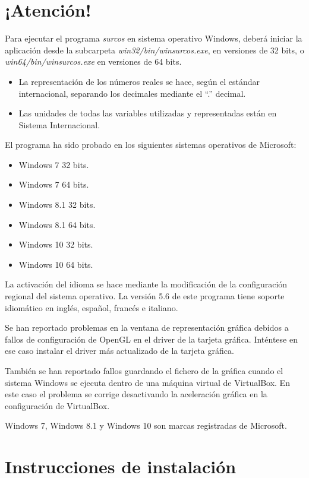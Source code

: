 \chapter*{¡Atención!}

Para ejecutar el programa \emph{surcos} en sistema operativo Windows, deberá
iniciar la aplicación desde la subcarpeta \emph{win32/bin/winsurcos.exe}, en
versiones de 32 bits, o \emph{win64/bin/winsurcos.exe} en versiones de 64 bits.

\begin{itemize}
\item La representación de los números reales se hace, según el estándar
internacional, separando los decimales mediante el ``.'' decimal.
\item Las unidades de todas las variables utilizadas y representadas están en
Sistema Internacional.
\end{itemize}

El programa ha sido probado en los siguientes sistemas operativos de Microsoft:
\begin{itemize}
\item Windows 7 32 bits.
\item Windows 7 64 bits.
\item Windows 8.1 32 bits.
\item Windows 8.1 64 bits.
\item Windows 10 32 bits.
\item Windows 10 64 bits.
\end{itemize}

La activación del idioma se hace mediante la modificación de la configuración
regional del sistema operativo. La versión 5.6 de este programa tiene soporte
idiomático en inglés, español, francés e italiano. 

Se han reportado problemas en la ventana de representación gráfica debidos a
fallos de configuración de OpenGL en el driver de la tarjeta gráfica. Inténtese
en ese caso instalar el driver más actualizado de la tarjeta gráfica.

También se han reportado fallos guardando el fichero de la gráfica cuando el
sistema Windows se ejecuta dentro de una máquina virtual de VirtualBox. En este
caso el problema se corrige desactivando la aceleración gráfica en la
configuración de VirtualBox.

Windows 7, Windows 8.1 y Windows 10 son marcas registradas de Microsoft.

\setcounter{page}{1}

\chapter{Instrucciones de instalación}

